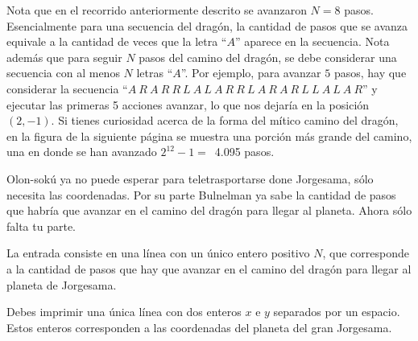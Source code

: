 \documentclass{oci}
\begin{document}
Nota que en el recorrido anteriormente descrito se avanzaron $N=8$ pasos. Esencialmente para una secuencia del dragón, la cantidad de pasos que se avanza equivale a la cantidad de veces que la letra ``$A$'' aparece en la secuencia.
Nota además que para seguir $N$ pasos del camino del dragón, se debe considerar una secuencia con al menos $N$ letras ``$A$''. 
Por ejemplo, para avanzar $5$ pasos, hay que considerar la secuencia ``$A\ R\ A\ R\ R\ L\ A\ L\ A\ R\ R\ L\ A\ R\ A\ R\ L\ L\ A\ L\ A\ R$'' y ejecutar
las primeras 5 acciones avanzar, lo que nos dejaría en la posición $(2,-1)$.
Si tienes curiosidad acerca de la forma del mítico camino del dragón, en la figura de la siguiente página se muestra una porción más grande del camino, una en donde se han avanzado $2^{12}-1=$\ 4.095 pasos.


Olon-sokú ya no puede esperar para teletrasportarse done Jorgesama, sólo necesita las coordenadas. Por su parte Bulnelman ya sabe la cantidad de pasos que habría que avanzar en el camino del dragón para llegar al planeta. Ahora sólo falta tu parte.


\begin{inputDescription}
La entrada consiste en una línea con un único entero positivo $N$, que corresponde a la cantidad de pasos que hay que avanzar en el camino del dragón para llegar al planeta de Jorgesama.
\end{inputDescription}

\begin{outputDescription}
Debes imprimir una única línea con dos enteros $x$ e $y$ separados por un espacio.
Estos enteros corresponden a las coordenadas del planeta del gran Jorgesama.
\end{outputDescription}
\end{document}
